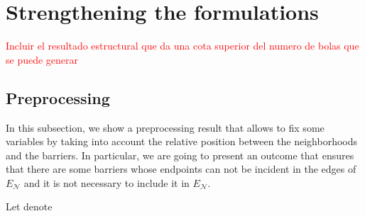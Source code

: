 \documentclass[a4paper]{elsarticle}
\newcommand{\EN}{{E^{}_{\mathcal N}}}
\begin{document}
%
%

\section{Strengthening the formulations}
\textcolor{red}{Incluir el resultado estructural que da una cota superior del numero de bolas que se puede generar}
\subsection{Preprocessing}
In this subsection, we show a preprocessing result that allows to fix some variables by taking into account the relative position between the neighborhoods and the barriers.
In particular, we are going to present an outcome that ensures that there are some barriers whose endpoints can not be incident in the edges of $\EN$ and it is not necessary to include it in $\EN$. 

Let denote
\end{document}

